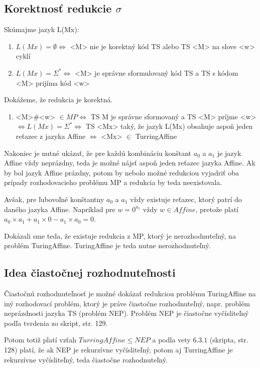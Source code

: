 \documentclass[10pt]{article}
\begin{document}
\subsection*{Korektnosť redukcie $\sigma$}
Skúmajme jazyk L(Mx):
\begin{enumerate}
    \item $L(Mx) = \emptyset \iff$ <M> nie je korektný kód TS alebo TS <M> na slove <w> cyklí 
    \item $L(Mx) = \Sigma^* \iff$ <M> je správne sformulovaný kód TS a TS s kódom <M> prijíma kód <w>
\end{enumerate}

Dokážeme, že redukcia je korektná.
\begin{enumerate}
    \item <M>\#<w> $\in MP \iff$ TS M je správne sformovaný a TS <M> príjme <w> $\iff L(Mx) =
        \Sigma^* \iff$ TS <Mx> taký, že jazyk L(Mx) obsahuje aspoň jeden reťazec z jazyka Affine
        $\iff$ <Mx> $\in$ TurringAffine
\end{enumerate}

Nakoniec je nutné ukázať, že pre každú kombináciu konštant $a_0$ a $a_1$ je jazyk Affine vždy
neprázdny, teda je možné nájsť aspoň jeden reťazec jazyka Affine. Ak by bol jazyk Affine prázdny,
potom by nebolo možné redukciou vyjadriť oba prípady rozhodovacieho problému MP a redukcia by teda
neexistovala. 

Avšak, pre ľubovoľné konštantny $a_0$ a $a_1$ vždy existuje reťazec, ktorý patrí do daného jazyka Affine.
Napríklad pre $w = 0^{a_1}$ vždy $w
\in Affine$, pretože platí $a_0 \times a_1 + a_1 \times 0 - a_1\times a_0 = 0$.

Dokázali sme teda, že existuje redukcia z MP, ktorý je nerozhodnuteľný, na problém TuringAffine.
TuringAffine je teda nutne nerozhodnuteľný.
\subsection*{Idea čiastočnej rozhodnuteľnosti}
Čiastočnú rozhodnuteľnosť je možné dokázať redukciou problému TuringAffine na iný rozhodovací
problém, ktorý je práve čiastočne rozhodnuteľný, napr. problém neprázdnosti jazyka TS (problém NEP). 
Problém NEP je čiastočne vyčísliteľný podľa tvrdenia zo skript, str. 129. 

Potom totiž platí vzťah $TurringAffine \leq NEP$ a podla vety $6.3.1$ (skripta, str. 128) platí, že
ak NEP je rekurzívne vyčísliteľný, potom aj TurringAffine je rekurzívne vyčísliteľný, teda čiastočne
rozhodnuteľný. 
\end{document}
